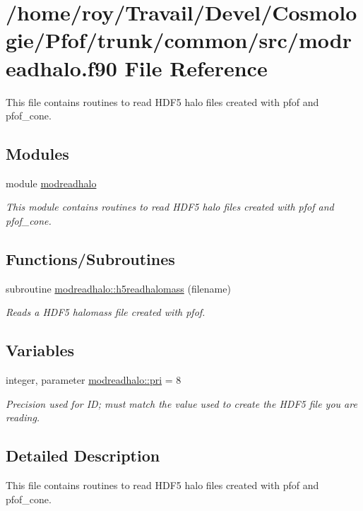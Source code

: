 \hypertarget{modreadhalo_8f90}{}\section{/home/roy/\+Travail/\+Devel/\+Cosmologie/\+Pfof/trunk/common/src/modreadhalo.f90 File Reference}
\label{modreadhalo_8f90}


This file contains routines to read H\+D\+F5 halo files created with pfof and pfof\+\_\+cone.  


\subsection*{Modules}
\begin{DoxyCompactItemize}
\item 
module \hyperlink{namespacemodreadhalo}{modreadhalo}
\begin{DoxyCompactList}\small\item\em This module contains routines to read H\+D\+F5 halo files created with pfof and pfof\+\_\+cone. \end{DoxyCompactList}\end{DoxyCompactItemize}
\subsection*{Functions/\+Subroutines}
\begin{DoxyCompactItemize}
\item 
subroutine \hyperlink{namespacemodreadhalo_a5e581ff805da170ad66cbd51e3b4967e}{modreadhalo\+::h5readhalomass} (filename)
\begin{DoxyCompactList}\small\item\em Reads a H\+D\+F5 halomass file created with pfof. \end{DoxyCompactList}\end{DoxyCompactItemize}
\subsection*{Variables}
\begin{DoxyCompactItemize}
\item 
integer, parameter \hyperlink{namespacemodreadhalo_ad55bcc6ce90e0b688319fd72bf579b36}{modreadhalo\+::pri} = 8
\begin{DoxyCompactList}\small\item\em Precision used for ID; must match the value used to create the H\+D\+F5 file you are reading. \end{DoxyCompactList}\end{DoxyCompactItemize}


\subsection{Detailed Description}
This file contains routines to read H\+D\+F5 halo files created with pfof and pfof\+\_\+cone. 

